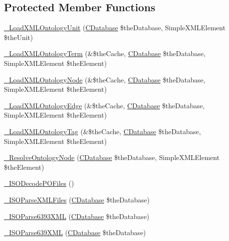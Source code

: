 \subsection*{Protected Member Functions}
\begin{DoxyCompactItemize}
\item 
\hyperlink{class_c_ontology_ae3e06b7824d7b902bd7bd5c9d393ab8a}{\-\_\-\-Load\-X\-M\-L\-Ontology\-Unit} (\hyperlink{class_c_database}{C\-Database} \$the\-Database, Simple\-X\-M\-L\-Element \$the\-Unit)
\item 
\hyperlink{class_c_ontology_af0ce6bf134670c99a34d23ff1643ff09}{\-\_\-\-Load\-X\-M\-L\-Ontology\-Term} (\&\$the\-Cache, \hyperlink{class_c_database}{C\-Database} \$the\-Database, Simple\-X\-M\-L\-Element \$the\-Element)
\item 
\hyperlink{class_c_ontology_a08a3e787742fde631feaefe426602e6f}{\-\_\-\-Load\-X\-M\-L\-Ontology\-Node} (\&\$the\-Cache, \hyperlink{class_c_database}{C\-Database} \$the\-Database, Simple\-X\-M\-L\-Element \$the\-Element)
\item 
\hyperlink{class_c_ontology_a736efd02f870b97c6cffcd73bcc4c16b}{\-\_\-\-Load\-X\-M\-L\-Ontology\-Edge} (\&\$the\-Cache, \hyperlink{class_c_database}{C\-Database} \$the\-Database, Simple\-X\-M\-L\-Element \$the\-Element)
\item 
\hyperlink{class_c_ontology_a889fdf93b0cf4cbf631e4cfd64006e5f}{\-\_\-\-Load\-X\-M\-L\-Ontology\-Tag} (\&\$the\-Cache, \hyperlink{class_c_database}{C\-Database} \$the\-Database, Simple\-X\-M\-L\-Element \$the\-Element)
\item 
\hyperlink{class_c_ontology_add240f87c2864b092a1435cac49d0647}{\-\_\-\-Resolve\-Ontology\-Node} (\hyperlink{class_c_database}{C\-Database} \$the\-Database, Simple\-X\-M\-L\-Element \$the\-Element)
\item 
\hyperlink{class_c_ontology_a09272a637e5f3edb5575253ff6127faa}{\-\_\-\-I\-S\-O\-Decode\-P\-O\-Files} ()
\item 
\hyperlink{class_c_ontology_a8bdcf5f69b661f7e714db4ff3f706302}{\-\_\-\-I\-S\-O\-Parse\-X\-M\-L\-Files} (\hyperlink{class_c_database}{C\-Database} \$the\-Database)
\item 
\hyperlink{class_c_ontology_a1cc310175e0b77d130f7e540c00a1772}{\-\_\-\-I\-S\-O\-Parse6393\-X\-M\-L} (\hyperlink{class_c_database}{C\-Database} \$the\-Database)
\item 
\hyperlink{class_c_ontology_adb0eec614edf29dd1986634fa4884ba3}{\-\_\-\-I\-S\-O\-Parse639\-X\-M\-L} (\hyperlink{class_c_database}{C\-Database} \$the\-Database)
\item 

\end{DoxyCompactItemize}
